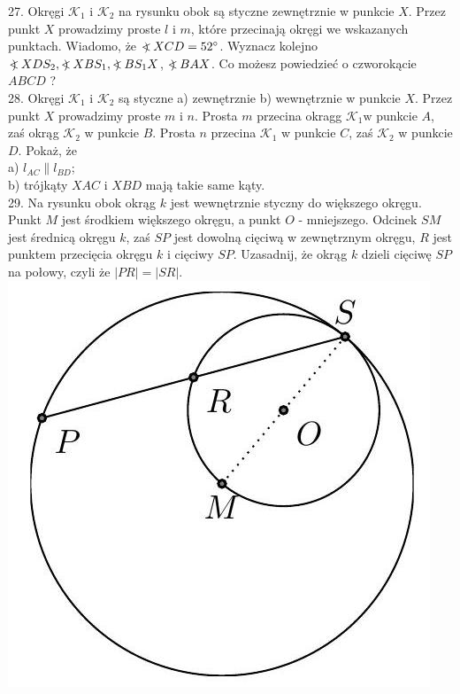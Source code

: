 \documentclass[10pt]{article}
\newcommand\Varangle{\mathop{{<\!\!\!\!\!\text{\small)}}\:}\nolimits}
\begin{document}
27. Okręgi \(\mathcal{K}_{1}\) i \(\mathcal{K}_{2}\) na rysunku obok są styczne zewnętrznie w punkcie \(X\). Przez punkt \(X\) prowadzimy proste \(l\) i \(m\), które przecinają okręgi we wskazanych punktach. Wiadomo, że \(\Varangle X C D=52^{\circ}\). Wyznacz kolejno \(\Varangle X D S_{2}, \Varangle X B S_{1}, \Varangle B S_{1} X\), \(\Varangle B A X\). Co możesz powiedzieć o czworokącie \(A B C D\) ?\\
28. Okręgi \(\mathcal{K}_{1}\) i \(\mathcal{K}_{2}\) są styczne a) zewnętrznie b) wewnętrznie w punkcie \(X\). Przez punkt \(X\) prowadzimy proste \(m\) i \(n\). Prosta \(m\) przecina okragg \(\mathcal{K}_{1} \mathrm{w}\) punkcie \(A\), zaś okrąg \(\mathcal{K}_{2}\) w punkcie \(B\). Prosta \(n\) przecina \(\mathcal{K}_{1}\) w punkcie \(C\), zaś \(\mathcal{K}_{2}\) w punkcie \(D\). Pokaż, że\\
a) \(l_{A C} \| l_{B D}\);\\
b) trójkąty \(X A C\) i \(X B D\) mają takie same kąty.\\
29. Na rysunku obok okrąg \(k\) jest wewnętrznie styczny do większego okręgu. Punkt \(M\) jest środkiem większego okręgu, a punkt \(O\) - mniejszego. Odcinek \(S M\) jest średnicą okręgu \(k\), zaś \(S P\) jest dowolną cięciwą w zewnętrznym okręgu, \(R\) jest punktem przecięcia okręgu \(k\) i cięciwy \(S P\). Uzasadnij, że okrąg \(k\) dzieli cięciwę \(S P\) na połowy, czyli że \(|P R|=|S R|\).\\
\includegraphics[max width=\textwidth, center]{2024_11_21_e9b4faa005d5be2cc318g-037(1)}
\end{document}
